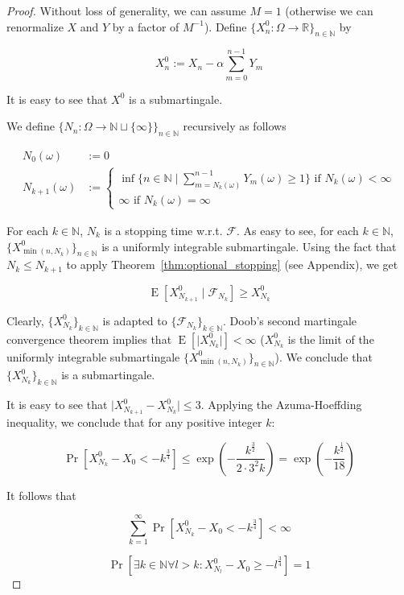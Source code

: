 \documentclass[11pt]{article}
\theoremstyle{definition}
\theoremstyle{plain}
\newcommand{\Nats}{\mathbb{N}}
\newcommand{\Reals}{\mathbb{R}}
\newcommand{\A}[1]{\lvert #1 \rvert}
\newcommand{\Sq}[2]{\{#1\}_{#2 \in \Nats}}
\newcommand{\Sqn}[1]{\Sq{#1}{n}}
\DeclareMathOperator{\E}{E}
\newcommand{\F}{\mathcal{F}}
\begin{document}
\begin{proof}

Without loss of generality, we can assume ${M = 1}$ (otherwise we can renormalize ${X}$ and ${Y}$ by a factor of ${M^{-1}}$). Define ${\Sqn{X^0_n: \Omega \rightarrow \Reals}}$ by

$$X^0_n := X_n - \alpha \sum_{m=0}^{n-1} Y_m$$

It is easy to see that ${X^0}$ is a submartingale.

We define ${\Sqn{N_n:\Omega \rightarrow \Nats \sqcup \{\infty\}}}$ recursively as follows

\begin{align*}
N_0\left(\omega\right) &:= 0 \\ 
N_{k+1}\left(\omega\right) &:= \begin{cases}\inf \{n \in \Nats \mid \sum_{m=N_k\left(\omega\right)}^{n-1} Y_m\left(\omega\right) \geq 1\} \text{ if } N_k\left(\omega\right) < \infty\\\infty \text{ if } N_k\left(\omega\right) = \infty\end{cases}
\end{align*}

For each $k \in \Nats$, $N_k$ is a stopping time w.r.t. ${\F}$. As easy to see, for each $k \in \Nats$, ${\Sqn{X^0_{\min\left(n,N_k\right)}}}$ is a uniformly integrable submartingale. Using the fact that ${N_{k} \leq N_{k+1}}$ to apply Theorem~\ref{thm:optional_stopping} (see Appendix), we get

$$\E[X^0_{N_{k+1}} \mid \F_{N_k}] \geq X^0_{N_{k}}$$

Clearly, ${\Sq{X^0_{N_k}}{k}}$ is adapted to ${\Sq{\F_{N_k}}{k}}$. Doob's second martingale convergence theorem implies that ${\E[\A{X^0_{N_k}}] < \infty}$ (${X^0_{N_k}}$ is the limit of the uniformly integrable submartingale ${\Sqn{X^0_{\min\left(n,N_k\right)}}}$). We conclude that ${\Sq{X^0_{N_k}}{k}}$ is a submartingale.

It is easy to see that ${\A{X^0_{N_{k+1}}-X^0_{N_k}}} \leq 3$. Applying the Azuma-Hoeffding inequality, we conclude that for any positive integer ${k}$:

$$\Pr[X^0_{N_k} - X_0 < -k^{\frac{3}{4}}] \leq \exp\left(-\frac{k^{\frac{3}{2}}}{2 \cdot 3^2k}\right)=\exp\left(-\frac{k^{\frac{1}{2}}}{18}\right)$$

It follows that

$$\sum_{k=1}^\infty \Pr[X^0_{N_k} - X_0 < -k^{\frac{3}{4}}] < \infty$$

$$\Pr[\exists k \in \Nats \forall l > k: X^0_{N_l} - X_0 \geq -l^{\frac{3}{4}}] = 1$$


\end{proof}
\end{document}
